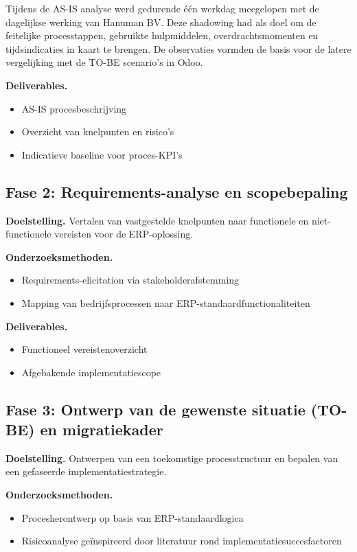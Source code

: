 Tijdens de AS-IS analyse werd gedurende één werkdag meegelopen met de dagelijkse werking van Hanuman BV. Deze shadowing had als doel om de feitelijke processtappen, gebruikte hulpmiddelen, overdrachtsmomenten en tijdsindicaties in kaart te brengen. De observaties vormden de basis voor de latere vergelijking met de TO-BE scenario’s in Odoo.

\textbf{Deliverables.}
\begin{itemize}
    \item AS-IS procesbeschrijving
    \item Overzicht van knelpunten en risico’s
    \item Indicatieve baseline voor proces-KPI’s
\end{itemize}

\subsection{Fase 2: Requirements-analyse en scopebepaling}

\textbf{Doelstelling.}  
Vertalen van vastgestelde knelpunten naar functionele en niet-functionele vereisten voor de ERP-oplossing.

\textbf{Onderzoeksmethoden.}
\begin{itemize}
    \item Requirements-elicitation via stakeholderafstemming
    \item Mapping van bedrijfsprocessen naar ERP-standaardfunctionaliteiten
\end{itemize}

\textbf{Deliverables.}
\begin{itemize}
    \item Functioneel vereistenoverzicht
    \item Afgebakende implementatiescope
\end{itemize}

\subsection{Fase 3: Ontwerp van de gewenste situatie (TO-BE) en migratiekader}

\textbf{Doelstelling.}  
Ontwerpen van een toekomstige processtructuur en bepalen van een gefaseerde implementatiestrategie.

\textbf{Onderzoeksmethoden.}
\begin{itemize}
    \item Procesherontwerp op basis van ERP-standaardlogica
    \item Risicoanalyse geïnspireerd door literatuur rond implementatiesuccesfactoren
\end{itemize}

